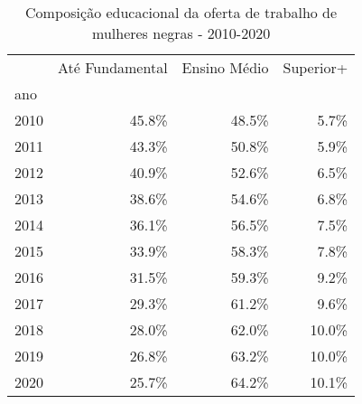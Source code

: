 \begin{table}
\centering
\caption{Composição educacional da oferta de trabalho de mulheres negras - 2010-2020}
\begin{tabular}{lrrr}
\toprule
{} &  Até Fundamental &  Ensino Médio &  Superior+ \\
ano  &                  &               &            \\
\midrule
2010 &            45.8\% &         48.5\% &       5.7\% \\
2011 &            43.3\% &         50.8\% &       5.9\% \\
2012 &            40.9\% &         52.6\% &       6.5\% \\
2013 &            38.6\% &         54.6\% &       6.8\% \\
2014 &            36.1\% &         56.5\% &       7.5\% \\
2015 &            33.9\% &         58.3\% &       7.8\% \\
2016 &            31.5\% &         59.3\% &       9.2\% \\
2017 &            29.3\% &         61.2\% &       9.6\% \\
2018 &            28.0\% &         62.0\% &      10.0\% \\
2019 &            26.8\% &         63.2\% &      10.0\% \\
2020 &            25.7\% &         64.2\% &      10.1\% \\
\bottomrule
\end{tabular}
\end{table}
